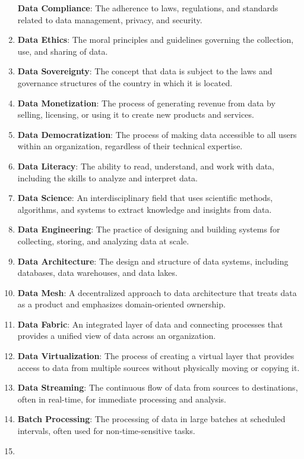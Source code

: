 \documentclass[
  letterpaper,
  DIV=11,
  numbers=noendperiod]{scrartcl}
\begin{document}
\begin{enumerate}
  \textbf{Data Compliance}: The adherence to laws, regulations, and
  standards related to data management, privacy, and security.
\item
  \textbf{Data Ethics}: The moral principles and guidelines governing
  the collection, use, and sharing of data.
\item
  \textbf{Data Sovereignty}: The concept that data is subject to the
  laws and governance structures of the country in which it is located.
\item
  \textbf{Data Monetization}: The process of generating revenue from
  data by selling, licensing, or using it to create new products and
  services.
\item
  \textbf{Data Democratization}: The process of making data accessible
  to all users within an organization, regardless of their technical
  expertise.
\item
  \textbf{Data Literacy}: The ability to read, understand, and work with
  data, including the skills to analyze and interpret data.
\item
  \textbf{Data Science}: An interdisciplinary field that uses scientific
  methods, algorithms, and systems to extract knowledge and insights
  from data.
\item
  \textbf{Data Engineering}: The practice of designing and building
  systems for collecting, storing, and analyzing data at scale.
\item
  \textbf{Data Architecture}: The design and structure of data systems,
  including databases, data warehouses, and data lakes.
\item
  \textbf{Data Mesh}: A decentralized approach to data architecture that
  treats data as a product and emphasizes domain-oriented ownership.
\item
  \textbf{Data Fabric}: An integrated layer of data and connecting
  processes that provides a unified view of data across an organization.
\item
  \textbf{Data Virtualization}: The process of creating a virtual layer
  that provides access to data from multiple sources without physically
  moving or copying it.
\item
  \textbf{Data Streaming}: The continuous flow of data from sources to
  destinations, often in real-time, for immediate processing and
  analysis.
\item
  \textbf{Batch Processing}: The processing of data in large batches at
  scheduled intervals, often used for non-time-sensitive tasks.
\item

\end{enumerate}
\end{document}
